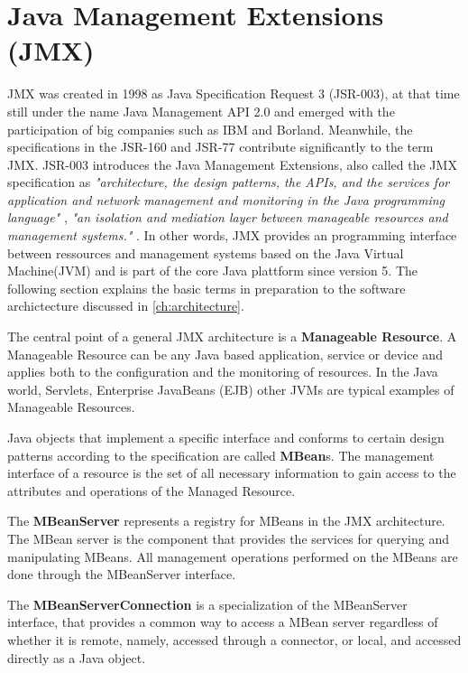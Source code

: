 \section{{Java Management Extensions (JMX)}}
\label{sec:jmx}
JMX was created in 1998 as Java Specification Request 3 (JSR-003), at that time still
under the name Java Management API 2.0 and emerged with the participation of big
companies such as IBM and Borland. Meanwhile, the specifications in the JSR-160 and
JSR-77 contribute significantly to the term JMX. JSR-003 introduces the Java Management
Extensions, also called the JMX specification as \textit{"architecture, the design patterns,
the APIs, and the services for application and network management and monitoring in
the Java programming language"} \cite{Sun13}, \textit{"an isolation and mediation layer between manageable
resources and management systems."} \cite{Kreg03}. In other words, JMX provides an programming interface between ressources
and management systems based on the Java Virtual Machine(JVM) and is part of the core Java plattform since
version 5. The following section explains the basic terms in preparation to the software archictecture discussed
in \autoref{ch:architecture}.

The central point of a general JMX architecture is a \textbf{Manageable Resource}.
A Manageable Resource can be any Java based application, service or device and
applies both to the configuration and the monitoring of resources. In the Java world,
Servlets, Enterprise JavaBeans (EJB) other JVMs are typical examples of Manageable Resources.

Java objects that implement a specific interface and conforms to certain design patterns according
to the specification are called \textbf{MBean}s. The management interface of a resource is the
set of all necessary information to gain access to the attributes and operations of the Managed Resource.

The \textbf{MBeanServer} represents a registry for MBeans in the JMX architecture. The MBean server is the
component that provides the services for querying and manipulating MBeans. All management operations performed on the
MBeans are done through the MBeanServer interface.

The \textbf{MBeanServerConnection} is a specialization of the MBeanServer interface, that provides a common way to
access a MBean server regardless of whether it is remote, namely, accessed through a connector, or local, and accessed
directly as a Java object.

